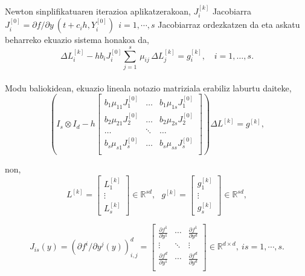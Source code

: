 Newton sinplifikatuaren iterazioa aplikatzerakoan, $J_i^{[k]}$ Jacobiarra $J_i^{[0]}=\partial f / \partial y \ (t+c_ih, Y_i^{[0]}) \ \ i=1,\cdots,s$ Jacobiarraz ordezkatzen da eta askatu beharreko ekuazio sistema honakoa da,
\begin{equation*}
\Delta L_{i}^{[k]}  - h b_i J_i^{[0]} \sum_{j=1}^{s}\, \mu_{ij} \, \Delta L_{j}^{[k]}=g_i^{[k]}, \quad  i=1 ,\ldots, s.
\end{equation*}

\paragraph*{}Modu baliokidean, ekuazio lineala notazio matriziala erabiliz laburtu daiteke,
\begin{equation*}
\left (I_s \otimes I_d - h  
\begin{bmatrix}
b_1 \mu_{11} J_1^{[0]} & \dots & b_1 \mu_{1s} J_1^{[0]} \\
b_2 \mu_{21} J_2^{[0]} & \dots & b_2 \mu_{2s} J_2^{[0]} \\
\dots          & \ddots & \dots \\
b_s \mu_{s1} J_s^{[0]} & \dots & b_s \mu_{ss} J_s^{[0]} \\ 
\end{bmatrix} \right) \Delta L^{[k]} =g^{[k]},
\end{equation*}

non,
\begin{equation*}
L^{[k]}=\begin{bmatrix}
L_1^{[k]} \\
\vdots \\
L_s^{[k]}
\end{bmatrix} \in \mathbb{R}^{sd}, \ \ \
g^{[k]}=\begin{bmatrix}
g_1^{[k]} \\
\vdots \\
g_s^{[k]}
\end{bmatrix} \in \mathbb{R}^{sd},  
\end{equation*}

\begin{equation*}
\label{eq:907}
J_{is}(y)=\left(\partial f^i/\partial y^j (y)\right)_{i,j}^d=
\begin{bmatrix}
    \frac{\partial f^1}{\partial y^1} & \cdots & \frac{\partial f^1}{\partial y^d}\\    
    \vdots & \ddots & \vdots \\    
    \frac{\partial f^d}{\partial y^1} & \cdots & \frac{\partial f^d}{\partial y^d}\\    
\end{bmatrix} \in \mathbb{R}^{d \times d}, \ is=1,\cdots,s.
\end{equation*}


